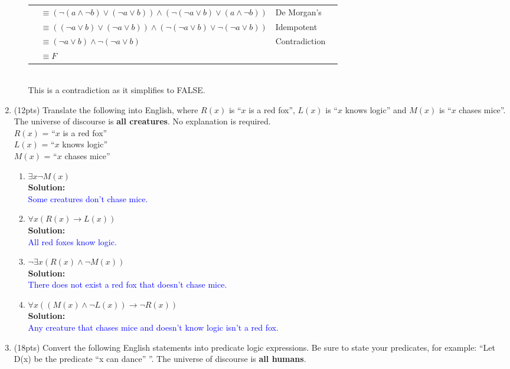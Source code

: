 \documentclass{article}
\renewcommand{\implies}{\rightarrow}
\newcommand{\sol}[1]{\textbf{Solution:\,}\textcolor{blue}{#1}}
\begin{document}
\begin{enumerate}
\begin{enumerate}
{\begin{tabular}{llll}
&$\equiv(\neg(a \land \neg b)\lor(\neg a \lor b))\land(\neg(\neg a \lor b)\lor(a \land \neg b))$&De Morgan's\\
&$\equiv((\neg a \lor b)\lor(\neg a \lor b))\land(\neg(\neg a \lor b)\lor\neg(\neg a \lor b))$&Idempotent\\
&$\equiv(\neg a \lor b)\land\neg(\neg a \lor b)$&Contradiction\\
&$\equiv F$&\\
\end{tabular}
\\This is a contradiction as it simplifies to FALSE.}
\end{enumerate}

\newpage

\item(12pts) Translate the following into English, where $R(x)$ is ``$x$ is a red fox'', $L(x)$ is ``$x$ knows logic'' and $M(x)$ is ``$x$ chases mice''. The universe of discourse is \textbf{all creatures}. No explanation is required.
\\$R(x)$ = ``$x$ is a red fox''
\\$L(x)$ = ``$x$ knows logic''
\\$M(x)$ = ``$x$ chases mice''
\begin{enumerate}
\item $\exists x \neg M(x)$
\\\sol{
\\Some creatures don't chase mice.
}
\item $\forall x (R(x) \implies L(x))$
\\\sol{
\\All red foxes know logic.
}
\item $\neg \exists x (R(x) \land \neg M(x))$
\\\sol{
\\There does not exist a red fox that doesn't chase mice.
}
\item $\forall x ((M(x) \land \neg L(x)) \implies \neg R(x))$
\\\sol{
\\Any creature that chases mice and doesn't know logic isn't a red fox.
}
\end{enumerate}

\newpage

\item(18pts) Convert the following English statements into predicate logic expressions. Be sure to state your predicates, for example: ``Let D(x) be the predicate ``x can dance'' ''. The universe of discourse is \textbf{all humans}.


\end{enumerate}
\end{document}
